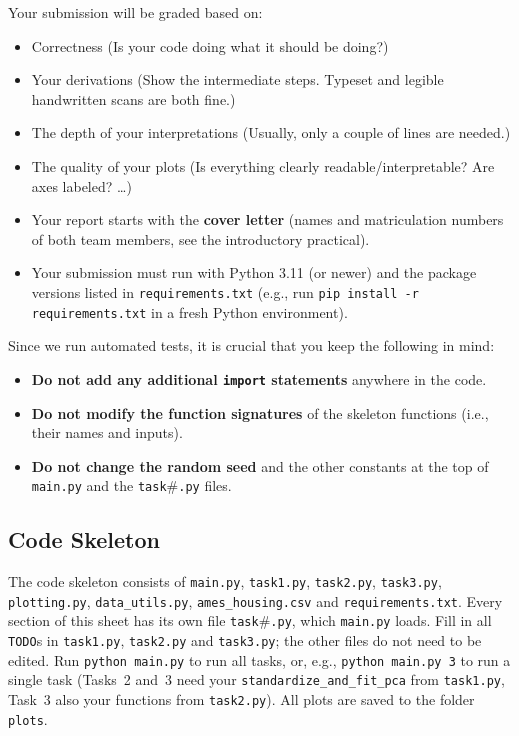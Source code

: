 \documentclass[hidelinks,10pt]{article}
\begin{document}
Your submission will be graded based on:
\begin{itemize}
    \item Correctness (Is your code doing what it should be doing?)
    \item Your derivations (Show the intermediate steps. Typeset and legible handwritten scans are both fine.)
    \item The depth of your interpretations (Usually, only a couple of lines are needed.)
    \item The quality of your plots (Is everything clearly readable/interpretable? Are axes labeled? \dots)
    \item Your report starts with the \textbf{cover letter} (names and matriculation numbers of both team members, see the introductory practical).
    \item Your submission must run with Python 3.11 (or newer) and the package versions listed in \texttt{requirements.txt} (e.g., run \texttt{pip install -r requirements.txt} in a fresh Python environment).
\end{itemize}

Since we run automated tests, it is crucial that you keep the following in mind:
\begin{itemize}
    \item \textbf{Do not add any additional \texttt{import} statements} anywhere in the code.
    \item \textbf{Do not modify the function signatures} of the skeleton functions (i.e., their names and inputs).
    \item \textbf{Do not change the random seed} and the other constants at the top of \texttt{main.py} and the \texttt{task}\#\texttt{.py} files.
\end{itemize}

\subsection*{Code Skeleton}
The code skeleton consists of \texttt{main.py}, \texttt{task1.py}, \texttt{task2.py}, \texttt{task3.py}, \texttt{plotting.py}, \texttt{data\_utils.py}, \texttt{ames\_housing.csv} and \texttt{requirements.txt}. Every section of this sheet has its own file \texttt{task}\#\texttt{.py}, which \texttt{main.py} loads. Fill in all \texttt{TODO}s in \texttt{task1.py}, \texttt{task2.py} and \texttt{task3.py}; the other files do not need to be edited. Run \texttt{python main.py} to run all tasks, or, e.g., \texttt{python main.py 3} to run a single task (Tasks~2 and~3 need your \texttt{standardize\_and\_fit\_pca} from \texttt{task1.py}, Task~3 also your functions from \texttt{task2.py}). All plots are saved to the folder \texttt{plots}.
\end{document}
